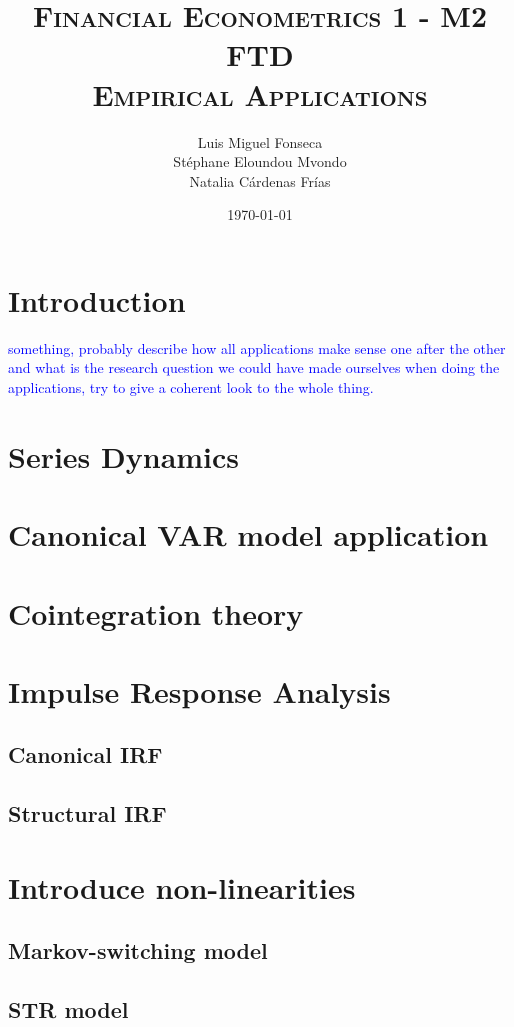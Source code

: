 \documentclass[hidelinks,12pts]{article}
\DeclareMathOperator{\1}{\mathbbm{1}}
\begin{document}
        \title{\scshape{Financial Econometrics 1 - M2 FTD \\ Empirical Applications}}
        \author{Luis Miguel Fonseca \\ Stéphane Eloundou Mvondo\\ Natalia Cárdenas Frías }
        \date{\today}
        \maketitle 

\tableofcontents
\newpage


\section*{Introduction} 
\textcolor{blue}{something, probably describe how all applications make sense one after the other and what is the research question we could have made ourselves when doing the applications, try to give a coherent look to the whole thing.}





\section{Series Dynamics}\label{sec:dynamics}




\section{Canonical VAR model application}\label{sec:var}




\section{Cointegration theory}\label{sec:cointegration}




\section{Impulse Response Analysis}\label{sec:irf}
    \subsection{Canonical IRF}\label{sec:canonical_irf}


    \subsection{Structural IRF}\label{sec:structural_irf}



\section{Introduce non-linearities}\label{sec:nonlinearities}
    \subsection{Markov-switching model}\label{sec:markov}

    
    \subsection{STR model}\label{sec:str}


    
\end{document}
